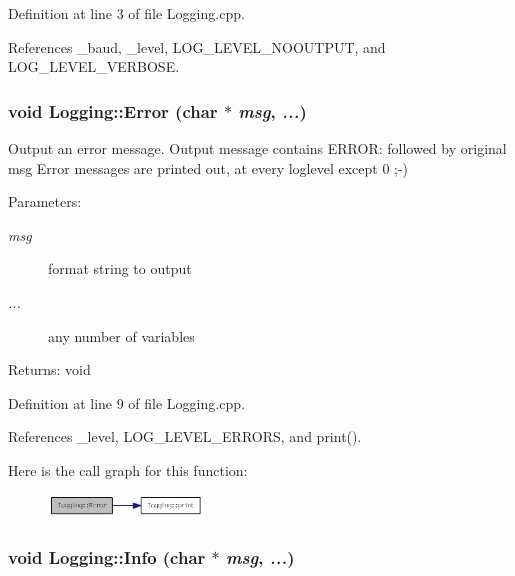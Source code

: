 Definition at line 3 of file Logging.cpp.

References \_\-baud, \_\-level, LOG\_\-LEVEL\_\-NOOUTPUT, and LOG\_\-LEVEL\_\-VERBOSE.\hypertarget{class_logging_1cf44ab531c72761fba811882336a2ad}{
\subsubsection[Error]{\setlength{\rightskip}{0pt plus 5cm}void Logging::Error (char $\ast$ {\em msg}, \/   {\em ...})}}
\label{class_logging_1cf44ab531c72761fba811882336a2ad}


Output an error message. Output message contains ERROR: followed by original msg Error messages are printed out, at every loglevel except 0 ;-) \begin{Desc}
\item[Parameters:]
\begin{description}
\item[{\em msg}]format string to output \item[{\em ...}]any number of variables \end{description}
\end{Desc}
\begin{Desc}
\item[Returns:]void \end{Desc}


Definition at line 9 of file Logging.cpp.

References \_\-level, LOG\_\-LEVEL\_\-ERRORS, and print().

Here is the call graph for this function:\nopagebreak
\begin{figure}[H]
\begin{center}
\leavevmode
\includegraphics[width=117pt]{class_logging_1cf44ab531c72761fba811882336a2ad_cgraph}
\end{center}
\end{figure}
\hypertarget{class_logging_8a99e1a55e2b24d864d89e9aa86b2f2e}{
\subsubsection[Info]{\setlength{\rightskip}{0pt plus 5cm}void Logging::Info (char $\ast$ {\em msg}, \/   {\em ...})}}
\label{class_logging_8a99e1a55e2b24d864d89e9aa86b2f2e}


